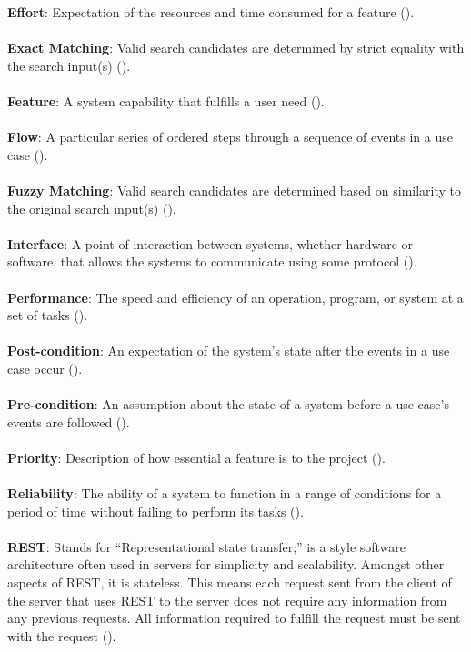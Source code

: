 \documentclass{article}
\begin{document}
\textbf{Effort}: Expectation of the resources and time consumed for a feature (\pageref{feature}).\\ \\
\textbf{Exact Matching}: Valid search candidates are determined by strict equality with the search input(s) (\pageref{feature}).\\ \\
\textbf{Feature}: A system capability that fulfills a user need (\pageref{feature}).\\ \\
\textbf{Flow}: A particular series of ordered steps through a sequence of events in a use case (\pageref{flow}).\\ \\
\textbf{Fuzzy Matching}: Valid search candidates are determined based on similarity to the original search input(s) (\pageref{feature}).\\ \\
\textbf{Interface}: A point of interaction between systems, whether hardware or software, that allows the systems to communicate using some protocol (\pageref{interface}).\\ \\
\textbf{Performance}: The speed and efficiency of an operation, program, or system at a set of tasks (\pageref{performance}).\\ \\
\textbf{Post-condition}: An expectation of the system's state after the events in a use case occur (\pageref{post_cond}).\\ \\
\textbf{Pre-condition}: An assumption about the state of a system before a use case's events are followed (\pageref{pre_cond}).\\ \\
\textbf{Priority}: Description of how essential a feature is to the project (\pageref{feature}).\\ \\
\textbf{Reliability}: The ability of a system to function in a range of conditions for a period of time without failing to perform its tasks (\pageref{reliability}).\\ \\
\textbf{REST}: Stands for ``Representational state transfer;'' is a style software architecture often used in servers for simplicity and scalability. Amongst other aspects of REST, it is stateless. This means each request sent from the client of the server that uses REST to the server does not require any information from any previous requests. All information required to fulfill the request must be sent with the request (\pageref{rest}).\\ \\
\end{document}
